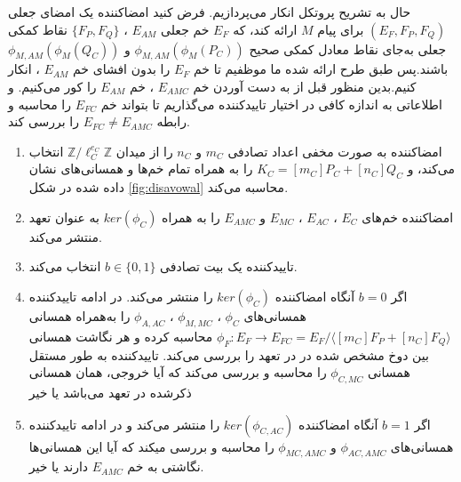 \documentclass[12pt,a4paper]{article}
\begin{document}
حال به تشریح پروتکل انکار می‌پردازیم. فرض کنید امضاکننده یک امضای جعلی
$(E_F,F_P,F_Q)$
برای پیام 
$M$
ارائه کند، که 
$E_F$
خم جعلی 
$E_{AM}$
،
$\{F_P,F_Q\}$
نقاط کمکی جعلی به‌جای نقاط معادل کمکی صحیح
$\phi_{M,AM}(\phi_M(P_C))$
و
$\phi_{M,AM}(\phi_M(Q_C))$
باشند.پس طبق طرح ارائه شده ما موظفیم تا خم
$E_F$
را بدون افشای خم
$E_{AM}$
، انکار کنیم.بدین منظور قبل از به دست آوردن خم
$E_{AMC}$
،
خم
$E_{AM}$
را کور می‌کنیم. و  اطلاعاتی به اندازه کافی در اختیار تاییدکننده می‌گذاریم تا بتواند خم
$E_{FC}$
را محاسبه و رابطه
$E_{FC} \ne E_{AMC}$
را بررسی کند.
\begin{enumerate}
	\item 
	امضاکننده به صورت مخفی اعداد تصادفی 
	$m_C$
	و
	$n_C$
	را از میدان
	$\mathbb{Z} / \ell_C^{e_C} \mathbb{Z}$
	انتخاب می‌کند، و 
	$K_C = [m_C]P_C + [n_C]Q_C$
	را به همراه تمام خم‌ها و همسانی‌های نشان داده شده در شکل 
\ref{fig:disavowal}
	 محاسبه می‌کند.
	
	\item 
	امضاکننده خم‌های
	$E_C$
	،
	$E_{AC}$
	،
	$E_{MC}$
	و
	$E_{AMC}$
	را به همراه 
	$ker(\phi_C)$
	به عنوان تعهد منتشر می‌کند.
	
	\item 
	تاییدکننده یک بیت تصادفی
	$b \in \{0,1\}$
	انتخاب می‌کند.
	
	\item 
	اگر
	$b=0$
	آنگاه امضاکننده 
	$ker(\phi_C)$
	را منتشر می‌کند. در ادامه تاییدکننده همسانی‌های 
	$\phi_C$
	،
	$\phi_{M,MC}$
	،
	$\phi_{A,AC}$
	را به‌همراه همسانی
	$\phi_F : E_F \rightarrow E_{FC} = E_F / \langle [m_C]F_P + [n_C]F_Q \rangle$
	محاسبه کرده و هر نگاشت همسانی بین دوخ مشخص شده در در تعهد را بررسی می‌کند. تاییدکننده به طور مستقل همسانی
	$\phi_{C,MC}$
	را محاسبه و بررسی می‌کند که آیا خروجی، همان همسانی ذکرشده در تعهد می‌باشد یا خیر
	
	\item 
	اگر 
	$b=1$
	آنگاه امضاکننده 
	$ker(\phi_{C,AC})$
	را منتشر می‌کند و در ادامه تاییدکننده همسانی‌های 
	$\phi_{AC,AMC}$
	و
	$\phi_{MC,AMC}$
	را محاسبه و بررسی میکند که آیا این همسانی‌ها نگاشتی به خم
	$E_{AMC}$
	دارند یا خیر.
\end{enumerate}
\end{document}
